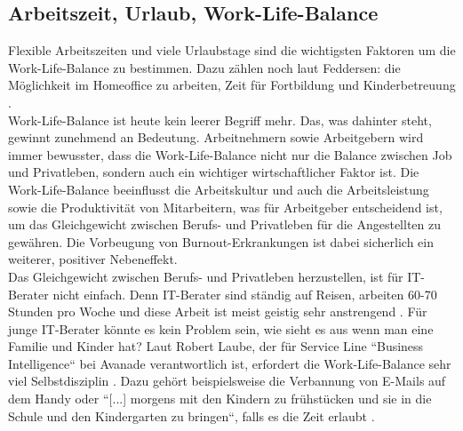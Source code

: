 \subsection*{Arbeitszeit, Urlaub, Work-Life-Balance}
Flexible Arbeitszeiten und viele Urlaubstage sind die wichtigsten Faktoren um die Work-Life-Balance zu bestimmen. Dazu zählen noch laut Feddersen: die Möglichkeit im Homeoffice zu arbeiten, Zeit für Fortbildung und Kinderbetreuung \cite{WLB}.\\
Work-Life-Balance ist heute kein leerer Begriff mehr. Das, was dahinter steht, gewinnt zunehmend an Bedeutung. Arbeitnehmern sowie Arbeitgebern wird immer bewusster, dass die Work-Life-Balance nicht nur die Balance zwischen Job und Privatleben, sondern auch ein wichtiger wirtschaftlicher Faktor ist. Die Work-Life-Balance beeinflusst die Arbeitskultur und auch die Arbeitsleistung sowie die Produktivität von Mitarbeitern, was für Arbeitgeber entscheidend ist, um das Gleichgewicht zwischen Berufs- und Privatleben für die Angestellten zu gewähren. Die Vorbeugung von Burnout-Erkrankungen ist dabei sicherlich ein weiterer, positiver Nebeneffekt. \cite{WLB} \\
Das Gleichgewicht zwischen Berufs- und Privatleben herzustellen, ist für IT-Berater nicht einfach. Denn IT-Berater sind ständig auf Reisen, arbeiten 60-70 Stunden pro Woche und diese Arbeit ist meist geistig  sehr anstrengend \cite{WLBbeiIT-Berater}. Für junge IT-Berater könnte es kein Problem sein, wie sieht es aus wenn man eine Familie und Kinder hat? Laut Robert Laube, der für Service Line ``Business Intelligence`` bei Avanade verantwortlich ist, erfordert die Work-Life-Balance sehr viel Selbstdisziplin \cite{WLBbeiIT-Berater}. Dazu gehört beispielsweise die Verbannung von E-Mails auf dem Handy oder ``[...] morgens mit den Kindern zu frühstücken und sie in die Schule und den Kindergarten zu bringen``, falls es die Zeit erlaubt \cite{WLBbeiIT-Berater}.
